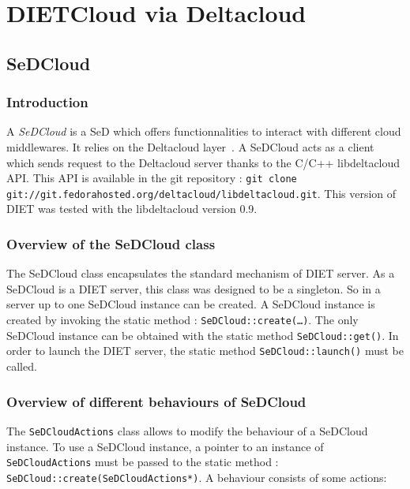 

\chapter{DIETCloud via Deltacloud}\label{chapter:Deltacloud}




\section{SeDCloud}

\subsection{Introduction}

A \emph{SeDCloud} is a SeD which offers functionnalities to interact with
different cloud middlewares. It relies on the Deltacloud
layer~\cite{Deltacloud}.  A SeDCloud acts as a client which sends
request to the Deltacloud server thanks to the C/C++ libdeltacloud
API. This API is available in the git repository : \texttt{git clone
  git://git.fedorahosted.org/deltacloud/libdeltacloud.git}.
This version of DIET was tested with the libdeltacloud version 0.9.

\subsection{Overview of the SeDCloud class}

The SeDCloud class encapsulates the standard mechanism of DIET server.
As a SeDCloud is a DIET server, this class was designed to be a
singleton. So in a server up to one SeDCloud instance can be created.
A SeDCloud instance is created by invoking the static method :
\texttt{SeDCloud::create(\ldots)}.  The only SeDCloud instance can be
obtained with the static method \texttt{SeDCloud::get()}.  In order to
launch the DIET server, the static method \texttt{SeDCloud::launch()}
must be called.

\subsection{Overview of different behaviours of SeDCloud\label{sec:SeDCloudActions}}


The \texttt{SeDCloudActions} class allows to modify the behaviour of a
SeDCloud instance. To use a SeDCloud instance, a pointer to an
instance of \texttt{SeDCloudActions} must be passed to the static
method : \texttt{SeDCloud::create(SeDCloudActions*)}. A behaviour
consists of some actions:

